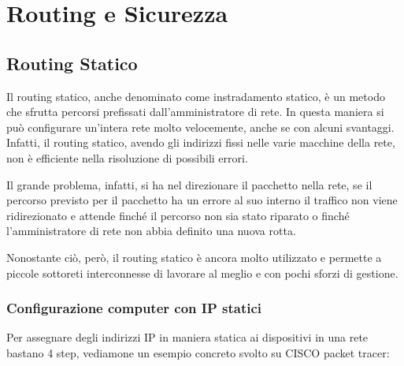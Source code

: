 \section{Routing e Sicurezza}
\subsection{Routing Statico}
Il routing statico, anche denominato come instradamento statico, è un metodo che sfrutta percorsi prefissati dall’amministratore di rete. In questa maniera si può configurare un'intera rete molto velocemente, anche se con alcuni svantaggi. Infatti, il routing statico, avendo gli indirizzi fissi nelle varie macchine della rete, non è efficiente nella risoluzione di possibili errori. 

Il grande problema, infatti, si ha nel direzionare il pacchetto nella rete, se il percorso previsto per il pacchetto ha un errore al suo interno il traffico non viene ridirezionato e attende finché il percorso non sia stato riparato o finché l'amministratore di rete non abbia definito una nuova rotta. 

Nonostante ciò, però, il routing statico è ancora molto utilizzato e permette a piccole sottoreti interconnesse di lavorare al meglio e con pochi sforzi di gestione.

\subsubsection*{Configurazione computer con IP statici}
Per assegnare degli indirizzi IP in maniera statica ai dispositivi in una rete bastano 4 step, vediamone un esempio concreto svolto su CISCO packet tracer:

